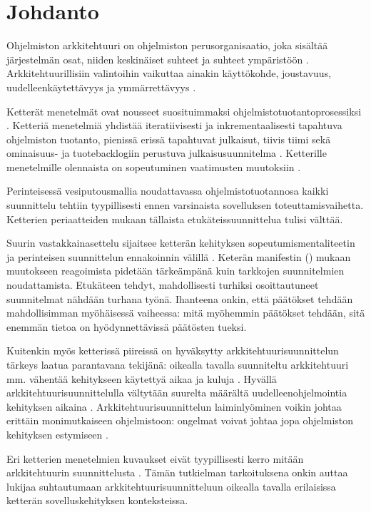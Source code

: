 \chapter{Johdanto}


Ohjelmiston arkkitehtuuri on ohjelmiston perusorganisaatio, joka sisältää järjestelmän osat, niiden keskinäiset suhteet ja suhteet ympäristöön \citep{jen_working_2000}. Arkkitehtuurillisiin valintoihin vaikuttaa ainakin käyttökohde, joustavuus, uudelleenkäytettävyys ja ymmärrettävyys \citep{kruchten2004rational}.

Ketterät menetelmät ovat nousseet suosituimmaksi ohjelmistotuotantoprosessiksi \citep{noauthor_14th_2020}. Ketteriä menetelmiä yhdistää iteratiivisesti ja inkrementaalisesti tapahtuva ohjelmiston tuotanto, pienissä erissä tapahtuvat julkaisut, tiivis tiimi sekä ominaisuus- ja tuotebacklogiin perustuva julkaisusuunnitelma \citep{babar_agile_2013}. Ketterille menetelmille olennaista on sopeutuminen vaatimusten muutoksiin \citep{fowler2001agile}. 

Perinteisessä vesiputousmallia noudattavassa ohjelmistotuotannosa kaikki suunnittelu tehtiin tyypillisesti ennen varsinaista sovelluksen toteuttamisvaihetta. Ketterien periaatteiden mukaan tällaista etukäteissuunnittelua tulisi välttää. 

Suurin vastakkainasettelu sijaitsee ketterän kehityksen sopeutumismentaliteetin ja perinteisen suunnittelun ennakoinnin välillä \citep{babar_agile_2013}. Keterän manifestin (\citeyear{fowler2001agile}) mukaan muutokseen reagoimista pidetään tärkeämpänä kuin tarkkojen suunnitelmien noudattamista. Etukäteen tehdyt, mahdollisesti turhiksi osoittautuneet suunnitelmat nähdään turhana työnä. Ihanteena onkin, että päätökset tehdään mahdollisimman myöhäisessä vaiheessa: mitä myöhemmin päätökset tehdään, sitä enemmän tietoa on hyödynnettävissä päätösten tueksi.

Kuitenkin myös ketterissä piireissä on hyväksytty arkkitehtuurisuunnittelun tärkeys laatua parantavana tekijänä: oikealla tavalla suunniteltu arkkitehtuuri mm. vähentää kehitykseen käytettyä aikaa ja kuluja \citep{babar_agile_2013}. Hyvällä arkkitehtuurisuunnittelulla vältytään suurelta määrältä uudelleenohjelmointia kehityksen aikaina \citep{eloranta2015techniques}. Arkkitehtuurisuunnittelun laiminlyöminen voikin johtaa erittäin monimutkaiseen ohjelmistoon: ongelmat voivat johtaa jopa ohjelmiston kehityksen estymiseen \citep{vogel2011software}. 

Eri ketterien menetelmien kuvaukset eivät tyypillisesti kerro mitään arkkitehtuurin suunnittelusta \citep{babar_agile_2013}. Tämän tutkielman tarkoituksena onkin auttaa lukijaa suhtautumaan arkkitehtuurisuunnitteluun oikealla tavalla erilaisissa ketterän sovelluskehityksen konteksteissa.


